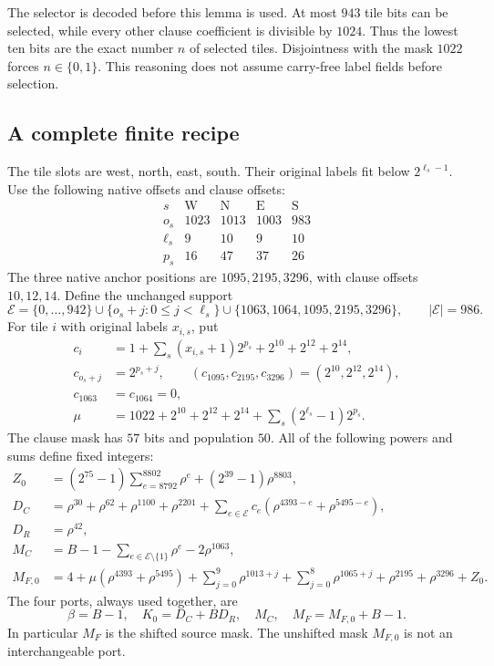 The selector is decoded before this lemma is used.  At most $943$ tile
bits can be selected, while every other clause coefficient is divisible
by $1024$.  Thus the lowest ten bits are the exact number $n$ of selected
tiles.  Disjointness with the mask $1022$ forces $n\in\{0,1\}$.
This reasoning does not assume carry-free label fields before selection.

\subsection{A complete finite recipe}

The tile slots are west, north, east, south.  Their original labels fit
below $2^{\ell_s-1}$.  Use the following native offsets and clause offsets:
\[
\begin{array}{c|rrrr}
 s&\mathrm W&\mathrm N&\mathrm E&\mathrm S\\\hline
 o_s&1023&1013&1003&983\\
 \ell_s&9&10&9&10\\
 p_s&16&47&37&26
\end{array}
\]
The three native anchor positions are $1095,2195,3296$, with clause
offsets $10,12,14$.  Define the unchanged support
\[
 \mathcal E=\{0,\ldots,942\}
 \cup\{o_s+j:0\le j<\ell_s\}
 \cup\{1063,1064,1095,2195,3296\},
 \qquad |\mathcal E|=986.
\]
For tile $i$ with original labels $x_{i,s}$, put
\begin{align*}
 c_i&=1+\sum_s(x_{i,s}+1)2^{p_s}+2^{10}+2^{12}+2^{14},\\
 c_{o_s+j}&=2^{p_s+j},\qquad
 (c_{1095},c_{2195},c_{3296})=(2^{10},2^{12},2^{14}),\\
 c_{1063}&=c_{1064}=0,\\
 \mu&=1022+2^{10}+2^{12}+2^{14}
       +\sum_s(2^{\ell_s}-1)2^{p_s}.
\end{align*}
The clause mask has $57$ bits and population $50$.  All of the following
powers and sums define fixed integers:
\begin{align*}
 Z_0&=(2^{75}-1)\sum_{e=8792}^{8802}\rho^e
                      +(2^{39}-1)\rho^{8803},\\
 D_C&=\rho^{30}+\rho^{62}+\rho^{1100}+\rho^{2201}
      +\sum_{e\in\mathcal E}c_e
             (\rho^{4393-e}+\rho^{5495-e}),\\
 D_R&=\rho^{42},\\
 M_C&=B-1-\sum_{e\in\mathcal E\setminus\{1\}}\rho^e
                 -2\rho^{1063},\\
 M_{F,0}&=4+\mu(\rho^{4393}+\rho^{5495})
       +\sum_{j=0}^{9}\rho^{1013+j}
       +\sum_{j=0}^{8}\rho^{1065+j}
       +\rho^{2195}+\rho^{3296}+Z_0.
\end{align*}
The four ports, always used together, are
\[
 \boxed{\beta=B-1,\quad K_0=D_C+BD_R,\quad M_C,
                  \quad M_F=M_{F,0}+B-1.}
\]
In particular $M_F$ is the shifted source mask.  The unshifted mask
$M_{F,0}$ is not an interchangeable port.

